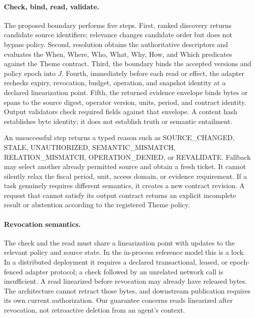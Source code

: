 \documentclass[11pt]{article}
\begin{document}
\paragraph{Check, bind, read, validate.}
The proposed boundary performs five steps. First, ranked discovery returns candidate source identifiers; relevance changes candidate order but does not bypass policy. Second, resolution obtains the authoritative descriptors and evaluates the When, Where, Who, What, Why, How, and Which predicates against the Theme contract. Third, the boundary binds the accepted versions and policy epoch into $J$. Fourth, immediately before each read or effect, the adapter rechecks expiry, revocation, budget, operation, and snapshot identity at a declared linearization point. Fifth, the returned evidence envelope binds bytes or spans to the source digest, operator version, units, period, and contract identity. Output validators check required fields against that envelope. A content hash establishes byte identity; it does not establish truth or semantic entailment.

An unsuccessful step returns a typed reason such as SOURCE\_CHANGED, STALE, UNAUTHORIZED, SEMANTIC\_MISMATCH, RELATION\_MISMATCH, OPERATION\_DENIED, or REVALIDATE. Fallback may select another already permitted source and obtain a fresh ticket. It cannot silently relax the fiscal period, unit, access domain, or evidence requirement. If a task genuinely requires different semantics, it creates a new contract revision. A request that cannot satisfy its output contract returns an explicit incomplete result or abstention according to the registered Theme policy.

\paragraph{Revocation semantics.}
The check and the read must share a linearization point with updates to the relevant policy and source state. In the in-process reference model this is a lock. In a distributed deployment it requires a declared transactional, leased, or epoch-fenced adapter protocol; a check followed by an unrelated network call is insufficient. A read linearized before revocation may already have released bytes. The architecture cannot retract those bytes, and downstream publication requires its own current authorization. Our guarantee concerns reads linearized after revocation, not retroactive deletion from an agent's context.
\end{document}
